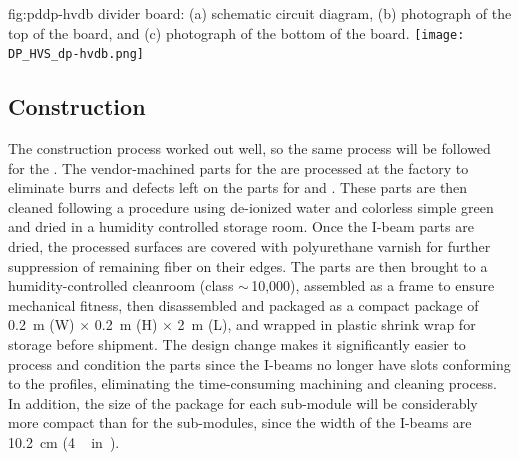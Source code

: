 \begin{dunefigure}{fig:pddp-hvdb}{  divider board: (a) schematic circuit diagram, (b) photograph of the top of the board, and (c) photograph of the bottom of the board.}
\texttt{[image: DP\_HVS\_dp-hvdb.png]}
\end{dunefigure}


\subsection{Construction}
\label{sec:fddp-hv-protodune-lessons-construction}
The  construction process worked out well, so the same process will be followed for the . 
The vendor-machined  parts for the  are processed at the factory to eliminate burrs and defects left on the parts for  and .   
These parts are then cleaned following a procedure using de-ionized water and colorless simple green  and dried in a humidity controlled storage room.
Once the  I-beam parts are dried, the processed surfaces %
are covered with polyurethane varnish for further suppression of remaining fiber on their edges. %
The parts are then brought to a humidity-controlled cleanroom (class $\sim\,$10,000), assembled as a frame to ensure mechanical fitness, then  disassembled and packaged as a compact package of \SI{0.2}{\m} (W) $\times$ \SI{0.2}{\m} (H) $\times$ \SI{2}{\m} (L), and wrapped in plastic shrink wrap for storage before shipment.
The design change makes it significantly easier to process and condition the  parts since the  I-beams no longer have slots conforming to the profiles, eliminating the time-consuming machining and cleaning process.
In addition, the size of the package for each sub-module will be considerably more compact than for the   sub-modules, since the width of the I-beams are \SI{10.2}{\cm} (\SI{4}\,in).

